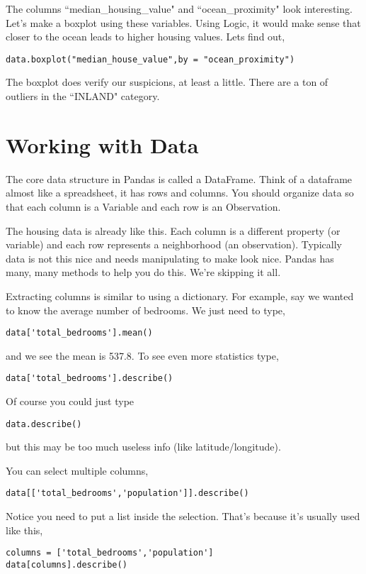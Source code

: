 \documentclass[11pt,letterpaper]{article}
\begin{document}
The columns ``median\_housing\_value" and ``ocean\_proximity" look interesting. Let's make a boxplot
using these variables. Using Logic, it would make sense that closer to the ocean leads to higher
housing values. Lets find out,
\begin{verbatim}
data.boxplot("median_house_value",by = "ocean_proximity")
\end{verbatim}
The boxplot does verify our suspicions, at least a little. There are a ton of outliers in the ``INLAND"
category.



\section{Working with Data}
The core data structure in Pandas is called a DataFrame. Think of a dataframe almost like a spreadsheet,
it has rows and columns. You should organize data so that each column is a Variable and each
row is an Observation. 

The housing data is already like this. Each column is a different property (or variable) and each
row represents a neighborhood (an observation). Typically data is not this nice and needs manipulating 
to make look nice. Pandas has many, many methods to help you do this. We're skipping it all.


Extracting columns is similar to using a dictionary. For example, say we wanted to know the average 
number of bedrooms. We just need to type,
\begin{verbatim}
data['total_bedrooms'].mean()
\end{verbatim}
and we see the mean is 537.8. To see even more statistics type,
\begin{verbatim}
data['total_bedrooms'].describe()
\end{verbatim}
Of course you could just type 
\begin{verbatim}
data.describe()
\end{verbatim}
but this may be too much useless info (like latitude/longitude). 

You can select multiple columns,
\begin{verbatim}
data[['total_bedrooms','population']].describe()
\end{verbatim}
Notice you need to put a list inside the selection. That's because it's usually used like this,
\begin{verbatim}
columns = ['total_bedrooms','population']
data[columns].describe()
\end{verbatim}
\end{document}
